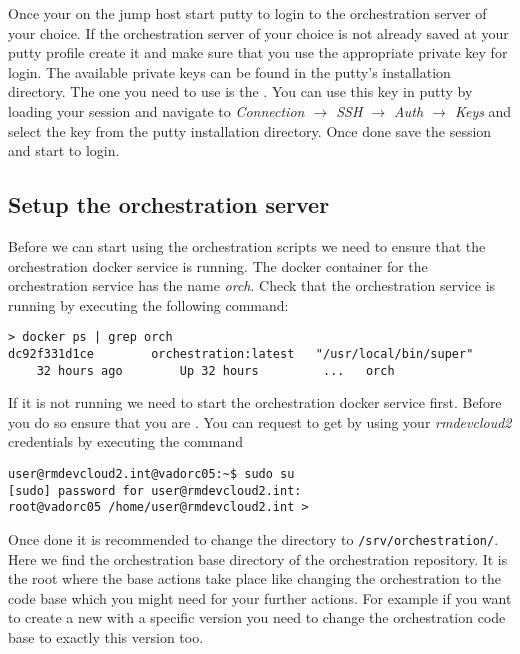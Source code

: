            Once your on the jump host start putty to login to the orchestration server of your choice. If the orchestration server of your choice is not already saved at your putty profile create it and make sure that you use the appropriate private key for login. The available private keys can be found in the putty's installation directory. The one you need to use is the \emph{\awsstddevkey}. You can use this key in putty by loading your session and navigate to \emph{Connection $\rightarrow$ SSH $\rightarrow$ Auth $\rightarrow$ Keys} and select the key from the putty installation directory. Once done save the session and start to login.
           
		\subsection{Setup the orchestration server}
             Before we can start using the orchestration scripts we need to ensure that the orchestration docker service is running. The docker container for the orchestration service has the name \emph{orch}. Check that the orchestration service is running by executing the following command:
         	\begin{verbatim}
> docker ps | grep orch
dc92f331d1ce        orchestration:latest   "/usr/local/bin/super"   
    32 hours ago        Up 32 hours         ...   orch
           	\end{verbatim}
           If it is not running we need to start the orchestration docker service first. Before you do so ensure that you are \rootuser{}. You can request to get \rootuser{} by using your \emph{rmdevcloud2} credentials by executing the command
             \begin{verbatim}
user@rmdevcloud2.int@vadorc05:~$ sudo su
[sudo] password for user@rmdevcloud2.int:
root@vadorc05 /home/user@rmdevcloud2.int >
           \end{verbatim}
           Once done it is recommended to change the directory to \texttt{/srv/orchestration/}. Here we find the orchestration base directory of the orchestration repository. It is the root where the base actions take place like changing the orchestration to the code base which you might need for your further actions. For example if you want to create a new \pod{} with a specific version you need to change the orchestration code base to exactly this version too.
           
